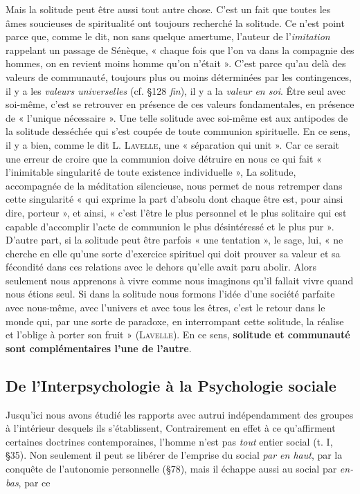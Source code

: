 Mais la solitude peut être aussi tout autre chose. C’est un fait que
toutes les âmes soucieuses de spiritualité ont toujours recherché la
solitude. Ce n’est point parce que, comme le dit, non sans quelque
amertume, l’auteur de l’{\it imitation} rappelant un passage de Sénèque,
« chaque fois que l’on va dans la compagnie des hommes, on en revient
moins homme qu’on n’était ». C’est parce qu’au delà des valeurs de
communauté, toujours plus ou moins déterminées par les contingences,
il y a les {\it valeurs universelles} (cf. \S 128 {\it fin}), il y a la {\it valeur en
soi}. Être seul avec soi-même, c’est se retrouver en présence de ces
valeurs fondamentales, en présence de « l’unique nécessaire ». Une
telle solitude avec soi-même est aux antipodes de la solitude desséchée
qui s’est coupée de toute communion spirituelle. En ce sens, il y a
bien, comme le dit L. \textsc{Lavelle}, une « séparation qui unit ». Car ce
serait une erreur de croire que la communion doive détruire en nous
ce qui fait « l’inimitable singularité de toute existence individuelle »,
La solitude, accompagnée de la méditation silencieuse, nous permet
de nous retremper dans cette singularité « qui exprime la part d’absolu
dont chaque être est, pour ainsi dire, porteur », et ainsi, « c’est l’être
le plus personnel et le plus solitaire qui est capable d'accomplir l'acte
de communion le plus désintéressé et le plus pur ». D’autre part, si la
solitude peut être parfois « une tentation », le sage, lui, « ne cherche
en elle qu’une sorte d’exercice spirituel qui doit prouver sa valeur et
sa fécondité dans ces relations avec le dehors qu’elle avait paru abolir.
Alors seulement nous apprenons à vivre comme nous imaginons qu’il
fallait vivre quand nous étions seul. Si dans la solitude nous formons
l’idée d’une société parfaite avec nous-même, avec l’univers et avec
tous les êtres, c’est le retour dans le monde qui, par une sorte de paradoxe,
en interrompant cette solitude, la réalise et l’oblige à porter
son fruit » (\textsc{Lavelle}). En ce sens, {\bf solitude et communauté sont
complémentaires l’une de l’autre}.

\subsection{De l’Interpsychologie à la Psychologie sociale}
Jusqu’ici
nous avons étudié les rapports avec autrui indépendamment
des groupes à l’intérieur desquels ils s’établissent, Contrairement en
effet à ce qu’affirment certaines doctrines contemporaines, l’homme
n’est pas {\it tout} entier social (t. I, \S 35). Non seulement il peut se libérer
de l’emprise du social {\it par en haut}, par la conquête de l'autonomie
personnelle (\S 78), mais il échappe aussi au social par {\it en-bas}, par ce
